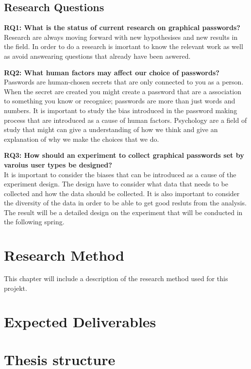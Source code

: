   \subsection*{Research Questions}

    {\bf RQ1: What is the status of current research on graphical passwords? } \\
    Research are always moving forward with new hypothesises and new results in the field. In order to do a research is imortant to know the relevant work as well as avoid answearing questions that already have been aswered.
    
    {\bf RQ2: What human factors may affect our choice of passwords?} \\
    Passwords are human-chosen secrets that are only connected to you as a person. When the secret are created you might create a password that are a association to something you know or recognice; passwords are more than just words and numbers. It is important to study the bias introduced in the password making process that are introduced as a cause of human factors. Psychology are a field of study that might can give a understanding of how we think and give an explanation of why we make the choices that we do. 
    
    {\bf RQ3: How should an experiment to collect graphical passwords set by varoius user types be designed?} \\
    It is important to consider the biases that can be introduced as a cause of the experiment design. The design have to consider what data that needs to be collected and how the data should be collected. It is also important to consider the diversity of the data in order to be able to get good resluts from the analysis. The result will be a detailed design on the experiment that will be conducted in the following spring. 

\section{Research Method}

  This chapter will include a description of the research method used for this projekt.


\section{Expected Deliverables}
  

\section{Thesis structure}





